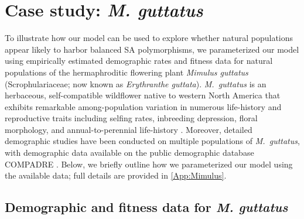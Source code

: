 \documentclass[11pt]{article}
\begin{document}
\section*{Case study: {\itshape M. guttatus}}


To illustrate how our model can be used to explore whether natural populations appear likely to harbor balanced SA polymorphisms, we parameterized our model using empirically estimated demographic rates and fitness data for natural populations of the hermaphroditic flowering plant {\itshape Mimulus guttatus} (Scrophulariaceae; now known as {\itshape Erythranthe guttata}). {\itshape M.~guttatus} is an herbaceous, self-compatible wildflower native to western North America that exhibits remarkable among-population variation in numerous life-history and reproductive traits including selfing rates, inbreeding depression, floral morphology, and annual-to-perennial life-history \citep[e.g.,][]{RitlandGanders1987, Ritland1990, Willis1993, Willis1999a, Willis1999b, WuWillis2008}. Moreover, detailed demographic studies have been conducted on multiple populations of {\itshape M.~guttatus}, with demographic data available on the public demographic database COMPADRE \citep{CompadreDB2020}. Below, we briefly outline how we parameterized our model using the available data; full details are provided in \ref{App:Mimulus}.

\subsection*{Demographic and fitness data for {\itshape M. guttatus}} \label{subsec:MguttMethods}
\end{document}
